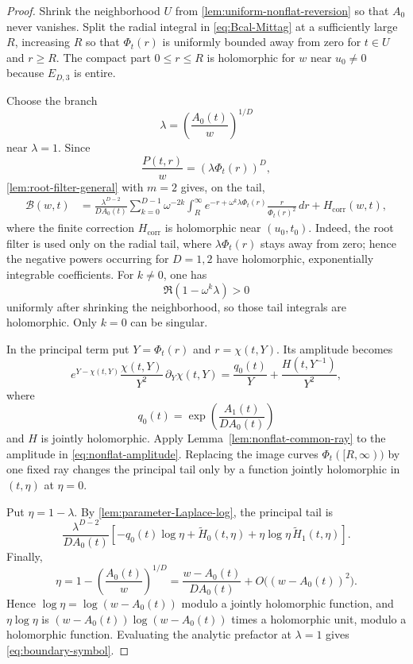 \documentclass[11pt]{article}
\numberwithin{equation}{section}
\theoremstyle{definition}
\theoremstyle{remark}
\newcommand{\Bcal}{\mathcal B}
\begin{document}
\begin{proof}
Shrink the neighborhood $U$ from \cref{lem:uniform-nonflat-reversion} so that $A_0$ never vanishes.  Split the radial integral in \eqref{eq:Bcal-Mittag} at a sufficiently large $R$, increasing $R$ so that $\Phi_t(r)$ is uniformly bounded away from zero for $t\in U$ and $r\ge R$.  The compact part $0\le r\le R$ is holomorphic for $w$ near $u_0\neq0$ because $E_{D,3}$ is entire.

Choose the branch
\[
  \lambda=\left(\frac{A_0(t)}w\right)^{1/D}
\]
near $\lambda=1$.  Since
\[
  \frac{P(t,r)}w=(\lambda\Phi_t(r))^D,
\]
\cref{lem:root-filter-general} with $m=2$ gives, on the tail,
\begin{align}\label{eq:root-tail-nonflat}
  \Bcal(w,t)
  &=\frac{\lambda^{D-2}}{DA_0(t)}
  \sum_{k=0}^{D-1}\omega^{-2k}
  \int_R^\infty
  e^{-r+\omega^k\lambda\Phi_t(r)}
  \frac{r}{\Phi_t(r)^2}\,dr
  +H_{\mathrm{corr}}(w,t),
\end{align}
where the finite correction $H_{\mathrm{corr}}$ is holomorphic near $(u_0,t_0)$.  Indeed, the root filter is used only on the radial tail, where $\lambda\Phi_t(r)$ stays away from zero; hence the negative powers occurring for $D=1,2$ have holomorphic, exponentially integrable coefficients.  For $k\neq0$, one has
\[
  \Re(1-\omega^k\lambda)>0
\]
uniformly after shrinking the neighborhood, so those tail integrals are holomorphic.  Only $k=0$ can be singular.

In the principal term put $Y=\Phi_t(r)$ and $r=\chi(t,Y)$.  Its amplitude becomes
\begin{equation}\label{eq:nonflat-amplitude}
  e^{Y-\chi(t,Y)}
  \frac{\chi(t,Y)}{Y^2}\,\partial_Y\chi(t,Y)
  =\frac{q_0(t)}Y+\frac{H(t,Y^{-1})}{Y^2},
\end{equation}
where
\[
  q_0(t)=\exp\!\left(\frac{A_1(t)}{DA_0(t)}\right)
\]
and $H$ is jointly holomorphic.  Apply Lemma~\ref{lem:nonflat-common-ray} to the
amplitude in \eqref{eq:nonflat-amplitude}.  Replacing the image curves
$\Phi_t([R,\infty))$ by one fixed ray changes the principal tail only by
a function jointly holomorphic in $(t,\eta)$ at $\eta=0$.

Put $\eta=1-\lambda$.  By \cref{lem:parameter-Laplace-log}, the principal tail is
\[
  \frac{\lambda^{D-2}}{DA_0(t)}
  \left[-q_0(t)\log\eta+\widetilde H_0(t,\eta)
  +\eta\log\eta\,\widetilde H_1(t,\eta)\right].
\]
Finally,
\[
  \eta=1-\left(\frac{A_0(t)}w\right)^{1/D}
  =\frac{w-A_0(t)}{DA_0(t)}
   +O\bigl((w-A_0(t))^2\bigr).
\]
Hence $\log\eta=\log(w-A_0(t))$ modulo a jointly holomorphic function, and $\eta\log\eta$ is $(w-A_0(t))\log(w-A_0(t))$ times a holomorphic unit, modulo a holomorphic function.  Evaluating the analytic prefactor at $\lambda=1$ gives \eqref{eq:boundary-symbol}.


\end{proof}
\end{document}

